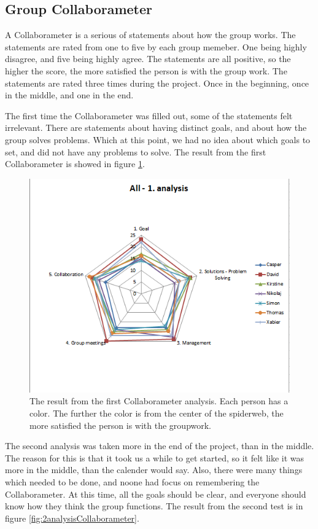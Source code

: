 \subsection{Group Collaborameter}
A Collaborameter is a serious of statements about how the group works. The statements are rated from one to five by each group memeber. One being highly disagree, and five being highly agree. The statements are all positive, so the higher the score, the more satisfied the person is with the group work. The statements are rated three times during the project. Once in the beginning, once in the middle, and one in the end. 

The first time the Collaborameter was filled out, some of the statements felt irrelevant. There are statements about having distinct goals, and about how the group solves problems. Which at this point, we had no idea about which goals to set, and did not have any problems to solve. The result from the first Collaborameter is showed in figure \ref{fig:1analysisCollaborameter}.

\begin{figure}
\centering
\includegraphics[width=0.7\linewidth]{graphics/1analysisCollaborameter}
\caption[Result from first Collaborameter analysis]{The result from the first Collaborameter analysis. Each person has a color. The further the color is from the center of the spiderweb, the more satisfied the person is with the groupwork.}
\label{fig:1analysisCollaborameter}
\end{figure}


The second analysis was taken more in the end of the project, than in the middle. The reason for this is that it took us a while to get started, so it felt like it was more in the middle, than the calender would say. Also, there were many things which needed to be done, and noone had focus on remembering the Collaborameter. At this time, all the goals should be clear, and everyone should know how they think the group functions. The result from the second test is in figure \ref{fig:2analysisCollaborameter}.

